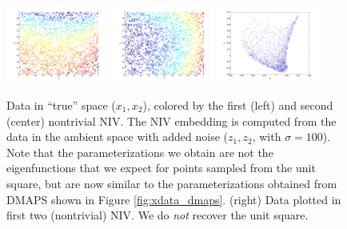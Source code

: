 \documentclass[12pt]{article}
\begin{document}
\begin{figure}[htb]
\includegraphics[width=0.3\textwidth]{xdata_noise2_colored_NIV1}
\includegraphics[width=0.3\textwidth]{xdata_noise2_colored_NIV2}
\includegraphics[width=0.3\textwidth]{embedding_noise2}
\caption{Data in ``true'' space ($x_1, x_2$), colored by the first (left) and second (center) nontrivial NIV. The NIV embedding is computed from the data in the ambient space with added noise ($z_1, z_2$, with $\sigma = 100$). Note that the parameterizations we obtain are not the eigenfunctions that we expect for points sampled from the unit square, but are now similar to the parameterizations obtained from DMAPS shown in Figure \ref{fig:xdata_dmaps}. (right) Data plotted in first two (nontrivial) NIV. We do {\em not} recover the unit square.}
\label{fig:xdata_NIV_noise2}
\end{figure}
\end{document}
